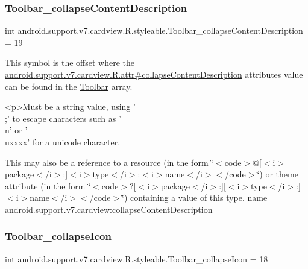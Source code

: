 \subsubsection{\texorpdfstring{Toolbar\+\_\+collapse\+Content\+Description}{Toolbar\_collapseContentDescription}}
{\footnotesize\ttfamily int android.\+support.\+v7.\+cardview.\+R.\+styleable.\+Toolbar\+\_\+collapse\+Content\+Description = 19\hspace{0.3cm}{\ttfamily [static]}}

This symbol is the offset where the \hyperlink{classandroid_1_1support_1_1v7_1_1cardview_1_1R_1_1attr_a63ef16088f42dd2933387645ad902d1a}{android.\+support.\+v7.\+cardview.\+R.\+attr\#collapse\+Content\+Description} attribute\textquotesingle{}s value can be found in the \hyperlink{classandroid_1_1support_1_1v7_1_1cardview_1_1R_1_1styleable_a26149aeb8fd339abe09ecc9d92b9304f}{Toolbar} array.

\begin{DoxyVerb}      <p>Must be a string value, using '\\;' to escape characters such as '\\n' or '\\uxxxx' for a unicode character.
\end{DoxyVerb}
 

This may also be a reference to a resource (in the form \char`\"{}$<$code$>$@\mbox{[}$<$i$>$package$<$/i$>$\+:\mbox{]}$<$i$>$type$<$/i$>$\+:$<$i$>$name$<$/i$>$$<$/code$>$\char`\"{}) or theme attribute (in the form \char`\"{}$<$code$>$?\mbox{[}$<$i$>$package$<$/i$>$\+:\mbox{]}\mbox{[}$<$i$>$type$<$/i$>$\+:\mbox{]}$<$i$>$name$<$/i$>$$<$/code$>$\char`\"{}) containing a value of this type.  name android.\+support.\+v7.\+cardview\+:collapse\+Content\+Description \mbox{\label{classandroid_1_1support_1_1v7_1_1cardview_1_1R_1_1styleable_a8eb012775ab40a813cfab4b5965dbc11}} 
\subsubsection{\texorpdfstring{Toolbar\+\_\+collapse\+Icon}{Toolbar\_collapseIcon}}
{\footnotesize\ttfamily int android.\+support.\+v7.\+cardview.\+R.\+styleable.\+Toolbar\+\_\+collapse\+Icon = 18\hspace{0.3cm}{\ttfamily [static]}}

